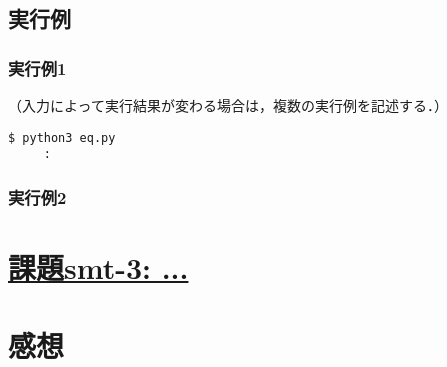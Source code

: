 \documentclass[12pt,fleqn]{jsarticle}
\begin{document}
\subsection*{実行例}
\subsubsection*{実行例1}

（入力によって実行結果が変わる場合は，複数の実行例を記述する．）

\begin{lstlisting}[style=ex]
$ python3 eq.py
     :
\end{lstlisting}

\subsubsection*{実行例2}

\section*{\underline{課題smt-3: ...}}


\section*{感想}
\end{document}
